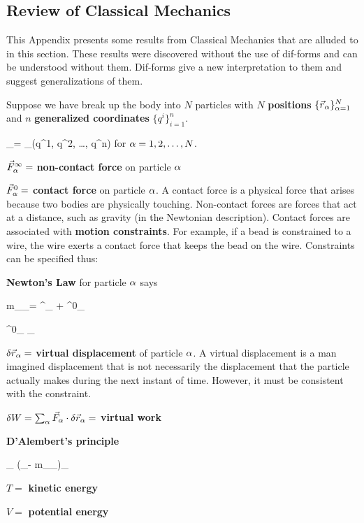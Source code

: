 \subsection{Review of Classical Mechanics}
This Appendix presents 
some results from
Classical Mechanics 
that are alluded to in this section.
These results were 
discovered without the use of dif-forms
and can be understood 
without them. Dif-forms give a new 
interpretation to them and suggest generalizations of them.

Suppose we have break up the body into $N$ particles with $N$  {\bf positions} $\{{\vec{r}}_\alpha\}_{\alpha=1}^N$ and
$n$  {\bf generalized coordinates }
$\{q^i\}_{i=1}^n$.




\beq
\vecr_\alp=
\vecr_\alp(q^1, q^2, \ldots, q^n)
\eeq
for $\alpha=1, 2, \ldots, N$.

$\vec{F}^\infty_\alpha=$ {\bf non-contact force}
on particle $\alpha$

$\vec{F}^0_\alpha=$ {\bf contact force}
on particle $\alpha$.
A contact force is a physical force that arises because two bodies are physically touching.
Non-contact forces 
are forces that act at a distance, such as gravity (in the Newtonian description).
Contact forces  are associated with {\bf motion constraints}. For example, if a bead is constrained to a wire, the wire exerts a
contact  force that keeps the bead on the wire. Constraints can be specified thus:


{\bf Newton's Law} for particle $\alpha$ says

\beq
m_\alp \ddot{\vecr}_\alp = ^\infty_\alp
+ ^0_\alp
\eeq


\beq
{}^0_\alp\cdot
\delta \vecr_
\eeq

$\delta {\vec{r}}_\alpha=$
{\bf virtual displacement} of particle $\alpha$.
A virtual displacement
is a man imagined displacement that is not necessarily the displacement that the particle actually makes during the next instant of time.
However, it must be consistent with the constraint.

$\delta W=
\sum_\alpha \vec{F}_\alpha
\cdot \delta 
{\vec{r}}_\alpha=$ {\bf virtual work}

{\bf D'Alembert's principle}

\beq
\sum_\alp
(_\alp   -
m_\alp {}_\alp)\cdot \delta \vecr_
\eeq



$T=$ {\bf kinetic energy}

$V=$ {\bf potential energy}

